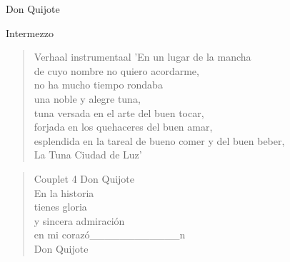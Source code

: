 \begin{song}{Don Quijote}
\begin{instrumental}{Intermezzo}
\measure{}\measure{}\measure{}\measure{}\measure{}\measure{}\measure{}\measure{}\measure{}\measure{}\measure{}\measure{}\measure{}\measure{}\measure{}\measure{}
\end{instrumental}

\begin{verse}{Verhaal instrumentaal}
'En un lugar de la mancha\\
de cuyo nombre no quiero acordarme,\\
no ha mucho tiempo rondaba\\
una noble y alegre tuna,\\
tuna versada en el arte del buen tocar,\\
forjada en los quehaceres del buen amar,\\
esplendida en la tareal de bueno comer y del buen beber,\\
La Tuna Ciudad de Luz'
\end{verse}


\begin{verse}{Couplet 4}
Don Quijote \\
En la historia\\
tienes gloria\\
y sincera admiración\hspace{1em}\\
en mi corazó\_\_\_\_\_\_\_\_\_\_\_\_n\\
Don Quijote  
\end{verse}
\end{song}
